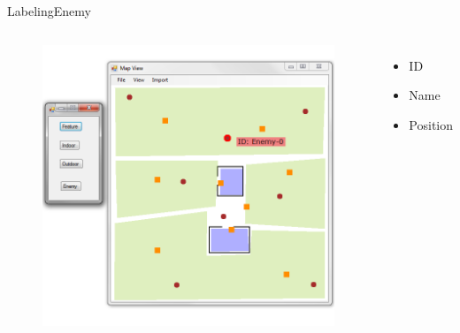 \begin{frame}{Labeling}{Enemy}

\begin{columns}
\begin{figure}
\centering
\includegraphics[width = \textwidth]{./screenshot/enemy_label.png}
\end{figure}

\begin{minipage}{\textwidth}
\begin{itemize}
\item ID
\item Name
\item Position
\end{itemize}
\end{minipage}
\end{columns}

\end{frame}

